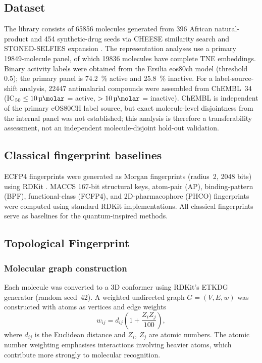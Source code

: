 \documentclass[11pt,a4paper]{article}
\begin{document}
\subsection{Dataset}

The library consists of \num{65856} molecules generated from \num{396} African natural-product and \num{454} synthetic-drug seeds via CHEESE similarity search \citep{lzicar_cheese_2024} and STONED-SELFIES expansion \citep{temgoua2026antimalarial}. The representation analyses use a primary \num{19849}-molecule panel, of which \num{19836} molecules have complete TNE embeddings. Binary activity labels were obtained from the Ersilia eos80ch model (threshold \num{0.5}); the primary panel is \qty{74.2}{\percent} active and \qty{25.8}{\percent} inactive. For a label-source-shift analysis, \num{22447} antimalarial compounds were assembled from ChEMBL~34 (IC$_{50} \leq \SI{10}{\micro\molar}$ = active, $> \SI{10}{\micro\molar}$ = inactive). ChEMBL is independent of the primary eOS80CH label source, but exact molecule-level disjointness from the internal panel was not established; this analysis is therefore a transferability assessment, not an independent molecule-disjoint hold-out validation.

\subsection{Classical fingerprint baselines}

ECFP4 fingerprints were generated as Morgan fingerprints (radius~2, \num{2048} bits) using RDKit \citep{rdkit_2024}. MACCS \num{167}-bit structural keys, atom-pair (AP), binding-pattern (BPF), functional-class (FCFP4), and 2D-pharmacophore (PHCO) fingerprints were computed using standard RDKit implementations. All classical fingerprints serve as baselines for the quantum-inspired methods.

\subsection{Topological Fingerprint}

\subsubsection{Molecular graph construction}

Each molecule was converted to a 3D conformer using RDKit's ETKDG generator (random seed~42). A weighted undirected graph $G = (V, E, w)$ was constructed with atoms as vertices and edge weights
\begin{equation}
w_{ij} = d_{ij}\left(1 + \frac{Z_i Z_j}{100}\right),
\end{equation}
where $d_{ij}$ is the Euclidean distance and $Z_i$, $Z_j$ are atomic numbers. The atomic number weighting emphasises interactions involving heavier atoms, which contribute more strongly to molecular recognition.
\end{document}
